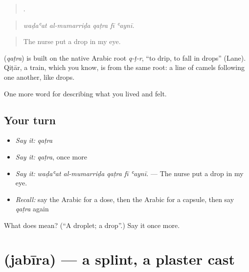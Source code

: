 \begin{quote}
    .
\end{quote}

\begin{quote}
\emph{waḍaʿat al-mumarriḍa qaṭra fī ʿaynī.}
\end{quote}

\begin{quote}
The nurse put a drop in my eye.
\end{quote}

\begin{cousinweb}
\textbf{} (\emph{qaṭra}) is built on the native Arabic root \emph{q-ṭ-r}, \textquotedblleft{}to drip, to fall in drops\textquotedblright{} (Lane). Qiṭār, a train, which you know, is from the same root: a line of camels following one another, like drops.
\end{cousinweb}

\begin{grammarlens}[title={What you've built}]
One more word for describing what you lived and felt.
\end{grammarlens}

\subsection*{Your turn}
\begin{itemize}
\raggedright
  \item \emph{Say it:} \emph{qaṭra}
  \item \emph{Say it:} \emph{qaṭra}, once more
  \item \emph{Say it:} \emph{waḍaʿat al-mumarriḍa qaṭra fī ʿaynī.} — The nurse put a drop in my eye.
  \item \emph{Recall:} say the Arabic for a dose, then the Arabic for a capsule, then say \emph{qaṭra} again
\end{itemize}

\begin{tcolorbox}[breakable,colback=teal!4,colframe=teal!35!black,title={Before you move on}]
What does  mean? (\textquotedblleft{}A droplet; a drop\textquotedblright{}.) Say it once more.
\end{tcolorbox}
\section[\texorpdfstring{\ar{جبيرة} (jabīra)}{جبيرة (jabīra)}]{ (jabīra) — a splint, a plaster cast}

